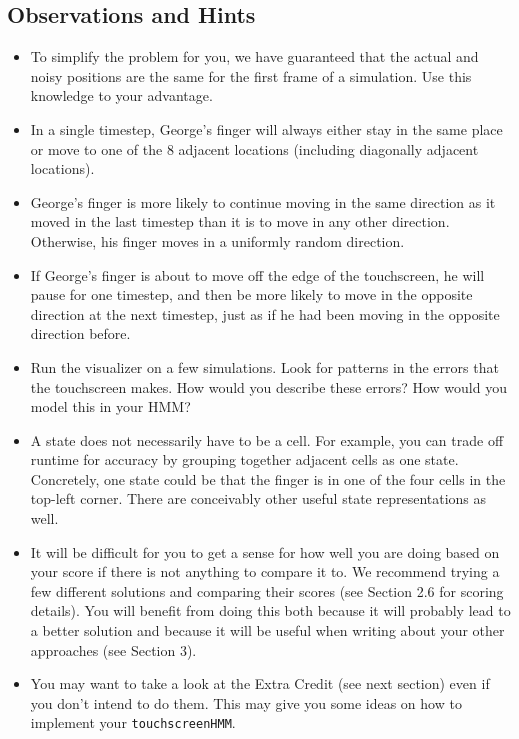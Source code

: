 \documentclass{article}
\begin{document}
    \subsection{Observations and Hints}
    \begin{itemize}
        \item To simplify the problem for you, we have guaranteed that the actual and noisy positions are the same for the first frame of a simulation. Use this knowledge to your advantage.  
        \item In a single timestep, George’s finger will always either stay in the same place or move to one of the 8 adjacent locations (including diagonally adjacent locations).
        \item George’s finger is more likely to continue moving in the same direction as it moved in the last timestep than it is to move in any other direction. Otherwise, his finger moves in a uniformly random direction. 
        \item If George’s finger is about to move off the edge of the touchscreen, he will pause for one timestep, and then be more likely to move in the opposite direction at the next timestep, just as if he had been moving in the opposite direction before.
        \item Run the visualizer on a few simulations. Look for patterns in the errors that the touchscreen makes. How would you describe these errors? How would you model this in your HMM?
        \item A state does not necessarily have to be a cell. For example, you can trade off runtime for accuracy by grouping together adjacent cells as one state. Concretely, one state could be that the finger is in one of the four cells in the top-left corner. There are conceivably other useful state representations as well.
        \item It will be difficult for you to get a sense for how well you are doing based on your score if there is not anything to compare it to. We recommend trying a few different solutions and comparing their scores (see Section 2.6 for scoring details). You will benefit from doing this both because it will probably lead to a better solution and because it will be useful when writing about your other approaches (see Section 3).
        \item You may want to take a look at the Extra Credit (see next section) even if you don't intend to do them. This may give you some ideas on how to implement your \texttt{touchscreenHMM}. 
    \end{itemize}
    
\end{document}
